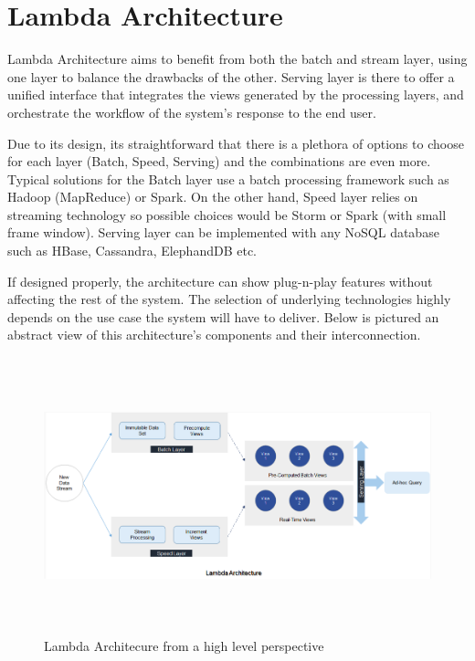 \documentclass{lmproj}
\begin{document}
\section{Lambda Architecture}
\label{relatedwork}


Lambda Architecture aims to benefit from both the batch and stream layer, using one layer to balance the drawbacks of the other. Serving layer is there to offer a unified interface that integrates the views generated by the processing layers, and orchestrate the workflow of the system's response to the end user.

Due to its design, its straightforward that there is a plethora of options to choose for each layer (Batch, Speed, Serving) and the combinations are even more. Typical solutions for the Batch layer use a batch processing framework such as Hadoop (MapReduce) or Spark. On the other hand, Speed layer relies on streaming technology so possible choices would be Storm or Spark (with small frame window). Serving layer can be implemented with any NoSQL database such as HBase, Cassandra, ElephandDB etc.

If designed properly, the architecture can show plug-n-play features without affecting the rest of the system. The selection of underlying technologies highly depends on the use case the system will have to deliver. Below is pictured an abstract view of this architecture's components and their interconnection.

\bigskip
\begin{figure}[h]
	\centering
	\includegraphics[width=16cm, height=8cm]{la_overview}
	\caption{Lambda Architecure from a high level perspective}
\end{figure}


\end{document}

